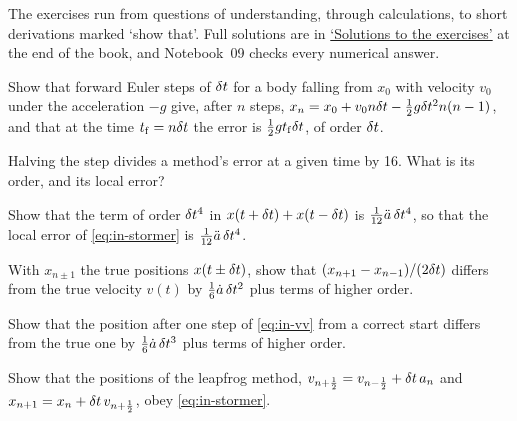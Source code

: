 \label{sec:in-exercises}

The exercises run from questions of understanding, through calculations,
to short derivations marked `show that'. Full solutions are in
\hyperref[sec:in-solutions]{`Solutions to the exercises'} at the end of
the book, and Notebook~09 checks every numerical answer.

\begin{exercise}
\label{ex:in-fall}
Show that forward Euler steps of $\delta t$ for a body falling from $x_0$ with
velocity $v_0$ under the acceleration $-g$ give, after $n$ steps,
$x_n = x_0 + v_0n\delta t - \frac12 g\delta t^2n(n - 1)$, and that at the time
$t_{\mathrm f} = n\delta t$ the error is $\frac12 gt_{\mathrm f}\delta t$, of order
$\delta t$.
\end{exercise}

\begin{exercise}
\label{ex:in-read}
Halving the step divides a method's error at a given time by 16. What is
its order, and its local error?
\end{exercise}

\begin{exercise}
\label{ex:in-stormer}
Show that the term of order $\delta t^4$ in $x(t + \delta t) + x(t - \delta t)$ is
$\frac1{12}\ddot{a}\,\delta t^4$, so that the local error of
\cref{eq:in-stormer} is $\frac1{12}\ddot{a}\,\delta t^4$.
\end{exercise}

\begin{exercise}
\label{ex:in-central}
With $x_{n\pm1}$ the true positions $x(t \pm \delta t)$, show that $(x_{n+1} -
x_{n-1})/(2\delta t)$ differs from the true velocity $v(t)$ by
$\frac16\dot{a}\,\delta t^2$ plus terms of higher order.
\end{exercise}

\begin{exercise}
\label{ex:in-local}
Show that the position after one step of \cref{eq:in-vv} from a correct
start differs from the true one by $\frac16\dot{a}\,\delta t^3$ plus terms of
higher order.
\end{exercise}

\begin{exercise}[leapfrog]
\label{ex:in-leapfrog}
Show that the positions of the leapfrog method, $v_{n+\frac12} =
v_{n-\frac12} + \delta t\,a_n$ and $x_{n+1} = x_n + \delta t\,v_{n+\frac12}$, obey
\cref{eq:in-stormer}.
\end{exercise}

